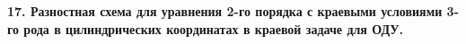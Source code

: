 \documentclass[a4paper,14pt]{article}
\begin{document}
\begin{figure}[!h]
	\label{fig:integr_interp4}
\end{figure}
\newpage
\begin{figure}[!h]
	\label{fig:integr_interp5}
\end{figure}

\textbf{17. Разностная схема для уравнения 2-го порядка с краевыми условиями 3-го рода в цилиндрических координатах в краевой задаче для ОДУ.}
\end{document}
